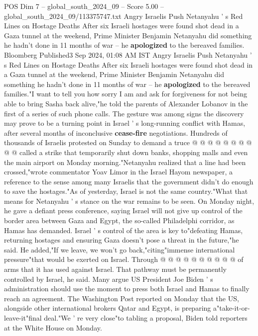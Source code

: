 \begin{textsample}{POS Dim 7 – global\_south\_2024\_09 – Score 5.00 – global\_south\_2024\_09/113375747.txt}  \label{ex:f7_pos_233}
Angry Israelis Push Netanyahu ' s Red Lines on Hostage Deaths After six Israeli hostages were found shot dead in a Gaza tunnel at the weekend, Prime Minister Benjamin Netanyahu did something he hadn't done in 11 months of war -- he \textbf{apologized} to the bereaved families.
Bloomberg Published3 Sep 2024, 01:08 AM IST Angry Israelis Push Netanyahu ' s Red Lines on Hostage Deaths After six Israeli hostages were found shot dead in a Gaza tunnel at the weekend, Prime Minister Benjamin Netanyahu did something he hadn't done in 11 months of war -- he \textbf{apologized} to the bereaved families."I want to tell you how sorry I am and ask for forgiveness for not being able to bring Sasha back alive,"he told the parents of Alexander Lobanov in the first of a series of such phone calls.
The gesture was among signs the discovery may prove to be a turning point in Israel ' s long-running conflict with Hamas, after several months of inconclusive \textbf{cease-fire} negotiations.
Hundreds of thousands of Israelis protested on Sunday to demand a truce @ @ @ @ @ @ @ @ @ @ called a strike that temporarily shut down banks, shopping malls and even the main airport on Monday morning."Netanyahu realized that a line had been crossed,"wrote commentator Yoav Limor in the Israel Hayom newspaper, a reference to the sense among many Israelis that the government didn't do enough to save the hostages."As of yesterday, Israel is not the same country."What that means for Netanyahu ' s stance on the war remains to be seen.
On Monday night, he gave a defiant press conference, saying Israel will not give up control of the border area between Gaza and Egypt, the so-called Philadelphi corridor, as Hamas has demanded.
Israel ' s control of the area is key to"defeating Hamas, returning hostages and ensuring Gaza doesn't pose a threat in the future,"he said.
He added,"If we leave, we won't go back,"citing"immense international pressure"that would be exerted on Israel.
Through @ @ @ @ @ @ @ @ @ @ of arms that it has used against Israel.
That pathway must be permanently controlled by Israel, he said.
Many argue US President Joe Biden ' s administration should use the moment to press both Israel and Hamas to finally reach an agreement.
The Washington Post reported on Monday that the US, alongside other international brokers Qatar and Egypt, is preparing a"take-it-or-leave-it"final deal."We ' re very close"to tabling a proposal, Biden told reporters at the White House on Monday.

\end{textsample}
